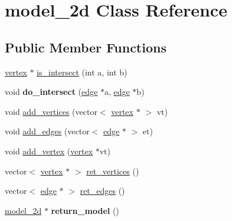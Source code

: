 \hypertarget{classmodel__2d}{}\section{model\+\_\+2d Class Reference}
\label{classmodel__2d}
\subsection*{Public Member Functions}
\begin{DoxyCompactItemize}
\item 
\hyperlink{classvertex}{vertex} $\ast$ \hyperlink{classmodel__2d_a7251a94523aa05a09203afd174b59ce1}{is\+\_\+intersect} (int a, int b)
\item 
void {\bfseries do\+\_\+intersect} (\hyperlink{classedge}{edge} $\ast$a, \hyperlink{classedge}{edge} $\ast$b)\hypertarget{classmodel__2d_a910a02de5a425bf7246fa578f5c23538}{}\label{classmodel__2d_a910a02de5a425bf7246fa578f5c23538}

\item 
void \hyperlink{classmodel__2d_a742ce3e9f537045a3e4fbf9aa1446c35}{add\+\_\+vertices} (vector$<$ \hyperlink{classvertex}{vertex} $\ast$ $>$ vt)
\item 
void \hyperlink{classmodel__2d_a61f0e93c47c4f4cec43d75b39a586db2}{add\+\_\+edges} (vector$<$ \hyperlink{classedge}{edge} $\ast$ $>$ et)
\item 
void \hyperlink{classmodel__2d_a0b1a57e36ba970523f063c61b77a7fdf}{add\+\_\+vertex} (\hyperlink{classvertex}{vertex} $\ast$vt)
\item 
vector$<$ \hyperlink{classvertex}{vertex} $\ast$ $>$ \hyperlink{classmodel__2d_a8d280c7ae53f602fff085fef1c57f81b}{ret\+\_\+vertices} ()
\item 
vector$<$ \hyperlink{classedge}{edge} $\ast$ $>$ \hyperlink{classmodel__2d_aafdd2f5684e7550dd5fb18b8543a16d9}{ret\+\_\+edges} ()
\item 
\hyperlink{classmodel__2d}{model\+\_\+2d} $\ast$ {\bfseries return\+\_\+model} ()\hypertarget{classmodel__2d_a635b8a014da2989cbec94c7acd38d0e4}{}\label{classmodel__2d_a635b8a014da2989cbec94c7acd38d0e4}


\end{DoxyCompactItemize}

